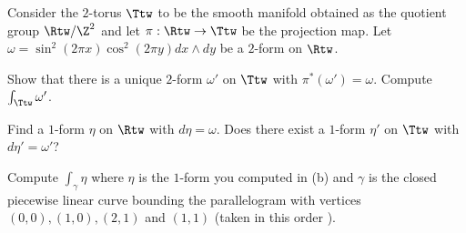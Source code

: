 Consider the $2$-torus $\Ttw$ to be the smooth manifold obtained as
the quotient group $\Rtw/\Z^2$ and let $\pi:\Rtw\rightarrow \Ttw$ be
the projection map. Let $\omega=\sin^2(2\pi x)\cos^2(2\pi y) dx\wedge
dy$ be a $2$-form on $\Rtw$.
\begin{alist}
\item Show that there is a unique $2$-form $\omega'$ on $\Ttw$ with
$\pi^*(\omega')=\omega$. Compute $\int_{\Ttw}\omega'$.
\item Find a $1$-form $\eta$ on $\Rtw$ with $d\eta=\omega$. Does there
exist a $1$-form $\eta'$ on $\Ttw$ with $d\eta'=\omega'$?
\item Compute $\int_{\gamma}\eta$ where $\eta$ is the $1$-form you
computed in (b) and $\gamma$ is the closed piecewise linear curve
bounding the parallelogram with vertices $(0,0),(1,0),(2,1)$ and
$(1,1)$ (taken in this order
).
\end{alist}
